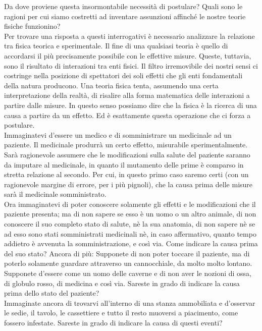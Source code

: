 \documentclass[]{article}
\begin{document}
	Da dove proviene questa insormontabile necessità di postulare? Quali sono le ragioni per cui siamo costretti ad inventare assunzioni affinché le nostre teorie fisiche funzionino? \\
	Per trovare una risposta a questi interrogativi è necessario analizzare la relazione tra fisica teorica e sperimentale. Il fine di una qualsiasi teoria è quello di accordarsi il più precisamente possibile con le effettive misure. Queste, tuttavia, sono il risultato di interazioni tra enti fisici. Il filtro irremovibile dei nostri sensi ci costringe nella posizione di spettatori dei soli effetti che gli enti fondamentali della natura producono. Una teoria fisica tenta, assumendo una certa interpretazione della realtà, di risalire alla forma matematica delle interazioni a partire dalle misure. In questo senso possiamo dire che la fisica è la ricerca di una causa a partire da un effetto. Ed è esattamente questa operazione che ci forza a postulare.\\
	Immaginatevi d'essere un medico e di somministrare un medicinale ad un paziente. Il medicinale produrrà un certo effetto, misurabile sperimentalmente. Sarà ragionevole assumere che le modificazioni sulla salute del paziente saranno da imputare al medicinale, in quanto il mutamento delle prime è comparso in stretta relazione al secondo. Per cui, in questo primo caso saremo certi (con un ragionevole margine di errore, per i più pignoli), che la causa prima delle misure sarà il medicinale somministrato.\\
	Ora immaginatevi di poter conoscere solamente gli effetti e le modificazioni che il paziente presenta; ma di non sapere se esso è un uomo o un altro animale, di non conoscere il suo completo stato di salute, nè la sua anatomia, di non sapere nè se ad esso sono stati somministrati medicinali nè, in caso affermativo, quanto tempo addietro è avvenuta la somministrazione, e così via. Come indicare la causa prima del suo stato? Ancora di più: Supponete di non poter toccare il paziente, ma di poterlo solamente guardare attraverso un cannocchiale, da molto molto lontano. Supponete d'essere come un uomo delle caverne e di non aver le nozioni di ossa, di globulo rosso, di medicina e così via.
	Sareste in grado di indicare la causa prima dello stato del paziente?\\
	Immaginate ancora di trovarvi all'interno di una stanza ammobiliata e d'osservar le sedie, il tavolo, le cassettiere e tutto il resto muoversi a piacimento, come fossero infestate. Sareste in grado di indicare la causa di questi eventi? \\
\end{document}

